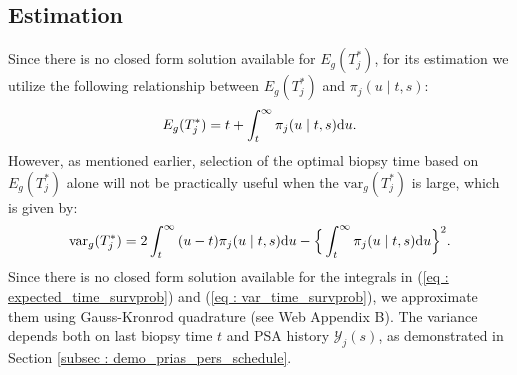 
\subsection{Estimation}
\label{subsec : estimation}
Since there is no closed form solution available for $E_g(T^*_j)$, for its estimation we utilize the following relationship between $E_g(T^*_j)$ and $\pi_j(u \mid t, s)$:
\begin{equation}
\label{eq : expected_time_survprob}
E_g(T^*_j) = t + \int_t^\infty \pi_j(u \mid t, s) \rmn{d} u.
\end{equation}
However, as mentioned earlier, selection of the optimal biopsy time based on $E_g(T_j^*)$ alone will not be practically useful when the $\mbox{var}_g(T^*_j)$ is large, which is given by:
\begin{equation}
\label{eq : var_time_survprob}
\mbox{var}_g(T^*_j) = 2 \int_t^\infty {(u-t) \pi_j(u \mid t, s) \rmn{d} u} - \Big\{\int_t^\infty \pi_j(u \mid t, s) \rmn{d} u\Big\}^2.
\end{equation}
Since there is no closed form solution available for the integrals in (\ref{eq : expected_time_survprob}) and (\ref{eq : var_time_survprob}), we approximate them using Gauss-Kronrod quadrature (see Web Appendix B). The variance depends both on last biopsy time $t$ and PSA history $\mathcal{Y}_j(s)$, as demonstrated in Section \ref{subsec : demo_prias_pers_schedule}.

